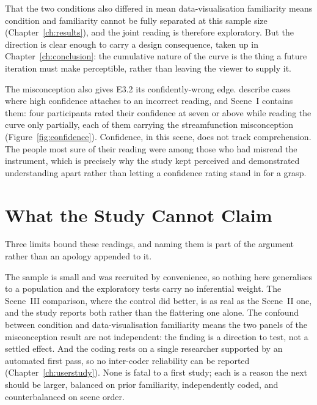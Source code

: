 That the two conditions also differed in mean data-visualisation familiarity means condition and familiarity cannot be fully separated at this sample size (Chapter~\ref{ch:results}), and the joint reading is therefore exploratory. But the direction is clear enough to carry a design consequence, taken up in Chapter~\ref{ch:conclusion}: the cumulative nature of the curve is the thing a future iteration must make perceptible, rather than leaving the viewer to supply it.

The misconception also gives E3.2 its confidently-wrong edge. \textcite{fischer2020} describe cases where high confidence attaches to an incorrect reading, and Scene~I contains them: four participants rated their confidence at seven or above while reading the curve only partially, each of them carrying the streamfunction misconception (Figure~\ref{fig:confidence}). Confidence, in this scene, does not track comprehension. The people most sure of their reading were among those who had misread the instrument, which is precisely why the study kept perceived and demonstrated understanding apart rather than letting a confidence rating stand in for a grasp.

\section{What the Study Cannot Claim}
\label{sec:disc-limits}

Three limits bound these readings, and naming them is part of the argument rather than an apology appended to it.

The sample is small and was recruited by convenience, so nothing here generalises to a population and the exploratory tests carry no inferential weight. The Scene~III comparison, where the control did better, is as real as the Scene~II one, and the study reports both rather than the flattering one alone. The confound between condition and data-visualisation familiarity means the two panels of the misconception result are not independent: the finding is a direction to test, not a settled effect. And the coding rests on a single researcher supported by an automated first pass, so no inter-coder reliability can be reported (Chapter~\ref{ch:userstudy}). None is fatal to a first study; each is a reason the next should be larger, balanced on prior familiarity, independently coded, and counterbalanced on scene order.

